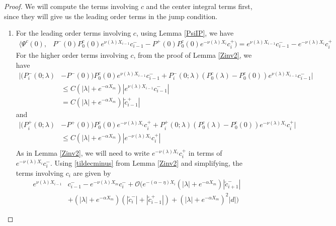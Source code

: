 \documentclass[thesis.tex]{subfiles}
\begin{document}
\begin{lemma}
\begin{proof}
We will compute the terms involving $c$ and the center integral terms first, since they will give us the leading order terms in the jump condition.
\begin{enumerate}
\item For the leading order terms involving $c$, using Lemma \ref{PsiIP}, we have
\begin{align*}
\langle \Psi^c(0), &P^-(0) P_0^c(0) e^{\nu(\lambda) X_{i-1}} c_{i-1}^- - P^+(0) P_0^c(0) e^{-\nu(\lambda)X_i} c_i^+) = e^{\nu(\lambda) X_{i-1}} c_{i-1}^- - e^{-\nu(\lambda)X_i} c_i^+ 
\end{align*}
For the higher order terms involving $c$, from the proof of Lemma \ref{Zinv2}, we have
\begin{align*}
|(P_i^-(0; \lambda) &- P^-(0)) P_0^c(0) e^{\nu(\lambda) X_{i-1}} c_{i-1}^- + P_i^-(0; \lambda) (P_0^c(\lambda) - P_0^c(0)) e^{\nu(\lambda) X_{i-1}} c_{i-1}^-| \\
&\leq C (|\lambda| + e^{-\alpha X_m}) |e^{\nu(\lambda) X_{i-1}} c_{i-1}^-|\\
&= C (|\lambda| + e^{-\alpha X_m}) |\tilde{c}_{i-1}^+|
\end{align*}
and
\begin{align*}
|(P_i^+(0; \lambda) &- P^+(0))P_0^c(0) e^{-\nu(\lambda)X_i} c_i^+ + P_i^+(0; \lambda) (P_0^c(\lambda) - P_0^c(0)) e^{-\nu(\lambda)X_i} c_i^+| \\
&\leq C (|\lambda| + e^{-\alpha X_m}) |e^{-\nu(\lambda)X_i} c_i^+| \\
\end{align*}
As in Lemma \ref{Zinv2}, we will need to write $e^{-\nu(\lambda)X_i} c_i^+$ in terms of $e^{-\nu(\lambda)X_i} c_i^-$. Using \eqref{tildecminus} from Lemma \ref{Zinv2} and simplifying, the terms involving $c_i$ are given by
\begin{align*}
e^{\nu(\lambda) X_{i-1} } &c_{i-1}^- - e^{-\nu(\lambda)X_m} c_i^- + \mathcal{O}\Big(
e^{-(\alpha - \eta)X_i} (|\lambda| + e^{-\alpha X_m}) |\tilde{c}_{i+1}^-| \\
&+ (|\lambda| + e^{-\alpha X_m})( |\tilde{c}_i^-| + |\tilde{c}_{i-1}^+|)
+ ( |\lambda| + e^{-\alpha X_m} )^2 |d|\Big)
\end{align*}


\end{enumerate}
\end{proof}
\end{lemma}
\end{document}
